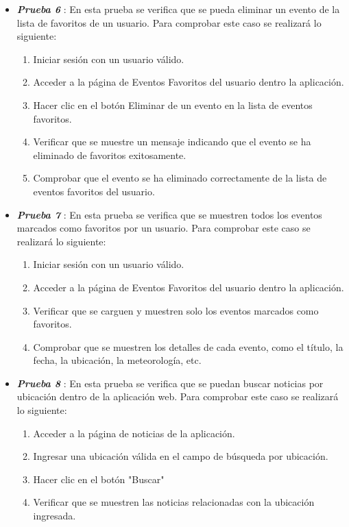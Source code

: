 \begin{itemize}
   \item \textbf{\textit{Prueba 6}} \label{Prueba6}: En esta prueba se verifica que se pueda eliminar un evento de la lista de favoritos de un usuario. Para comprobar este caso se realizará lo siguiente:
    
   \begin{enumerate}
        \item Iniciar sesión con un usuario válido. 
       \item Acceder a la página de Eventos Favoritos del usuario dentro la aplicación.
       \item Hacer clic en el botón Eliminar de un evento en la lista de eventos favoritos.
       \item Verificar que se muestre un mensaje indicando que el evento se ha eliminado de favoritos exitosamente.
       \item Comprobar que el evento se ha eliminado correctamente de la lista de eventos favoritos del usuario.
   \end{enumerate}

   \item \textbf{\textit{Prueba 7}} \label{Prueba7}: En esta prueba se verifica que se muestren todos los eventos marcados como favoritos por un usuario. Para comprobar este caso se realizará lo siguiente:
    
   \begin{enumerate}
        \item Iniciar sesión con un usuario válido. 
       \item Acceder a la página de Eventos Favoritos del usuario dentro la aplicación.
       \item Verificar que se carguen y muestren solo los eventos marcados como favoritos.
       \item Comprobar que se muestren los detalles de cada evento, como el título, la fecha, la ubicación, la meteorología, etc.
   \end{enumerate}


 \item \textbf{\textit{Prueba 8}}  \label{Prueba8}: En esta prueba se verifica que se puedan buscar noticias por ubicación dentro de la aplicación web. Para comprobar este caso se realizará lo siguiente:

   \begin{enumerate}
       \item Acceder a la página de noticias de la aplicación.
       \item Ingresar una ubicación válida en el campo de búsqueda por ubicación.
       \item Hacer clic en el botón "Buscar"
       \item  Verificar que se muestren las noticias relacionadas con la ubicación ingresada.
   \end{enumerate}


\end{itemize}
